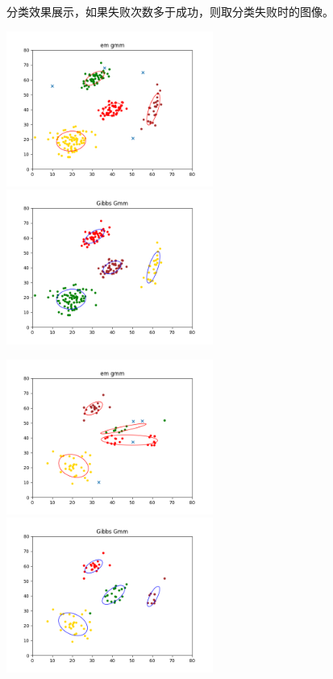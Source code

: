 \documentclass[hyperref,UTF8]{ctexart}
\begin{document}
\begin{table}[!htbp]
  \centering
\caption{样本数量对失败率的影响}
\label{tb:lda_knn}
\end{table}
\par
\par 分类效果展示，如果失败次数多于成功，则取分类失败时的图像。

\centerline{\includegraphics[height=2in]{exp-results/EM-200.png}\includegraphics[height=2in]{exp-results/Gibbs-200.png}}
\centerline{\includegraphics[height=2in]{exp-results/EM-80.png}\includegraphics[height=2in]{exp-results/Gibbs-80.png}}
\end{document}
